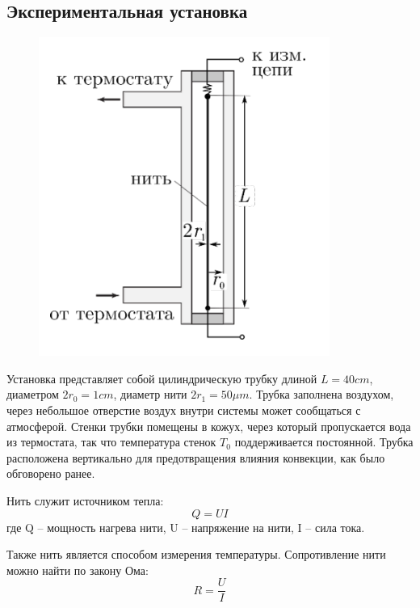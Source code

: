 \documentclass[a4paper,12pt]{report}
\begin{document}
    \subsection*{Экспериментальная установка}
    \begin{figure}
        \vspace{0mm}
        \centering
        \includegraphics[width=0.7\linewidth]{img/ustanovka}
    \end{figure}

    Установка представляет собой цилиндрическую трубку длиной $L=40cm$, диаметром $2r_0=1cm$, диаметр нити $2r_1=50\mu m$. Трубка заполнена воздухом, через небольшое отверстие воздух внутри системы может сообщаться с атмосферой. Стенки трубки помещены в кожух, через который пропускается вода из термостата, так что температура стенок $T_0$ поддерживается постоянной. Трубка расположена вертикально для предотвращения влияния конвекции, как было обговорено ранее.

    Нить служит источником тепла:
    \begin{equation}
        \label{q wire}
        Q=UI
    \end{equation}
    где Q -- мощность нагрева нити, U -- напряжение на нити, I -- сила тока.
    
    Также нить является способом измерения температуры.  Сопротивление нити можно найти по закону Ома:
    \begin{equation}
        \label{ohm}
        R=\frac{U}{I}
    \end{equation}  
    
\end{document}
